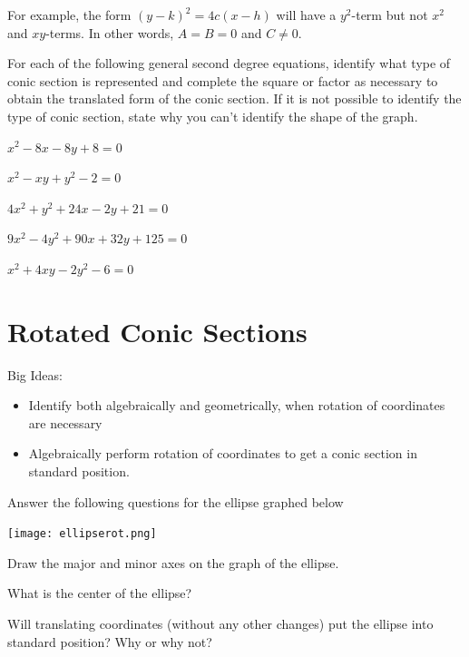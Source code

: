 For example, the form $(y-k)^2=4c(x-h)$ will have a $y^2$-term but not $x^2$ and $xy$-terms. In other words, $A=B=0$ and $C\neq 0$. \eq

\bq For each of the following general second degree equations, identify what type of conic section is represented and complete the square or factor as necessary to obtain the translated form of the conic section. If it is not possible to identify the type of conic section, state why you can't identify the shape of the graph.
\be
\item $x^2-8x-8y+8=0$
\item $x^2-xy+y^2-2=0$
\item $4x^2+y^2+24x-2y+21=0$
\item $9x^2-4y^2+90x+32y+125=0$
\item $x^2+4xy-2y^2-6=0$
\ee
\eq

\section{Rotated Conic Sections}
Big Ideas:
\begin{itemize}
\item Identify both algebraically and geometrically, when rotation of coordinates are necessary
\item Algebraically perform rotation of coordinates to get a conic section in standard position.
\end{itemize}
\bq
Answer the following questions for the ellipse graphed below
\begin{center} \texttt{[image: ellipserot.png]} \end{center}
\be
\item Draw the major and minor axes on the graph of the ellipse.
\item What is the center of the ellipse?
\item Will translating coordinates (without any other changes) put the ellipse into standard position? Why or why not?
\ee
\eq

